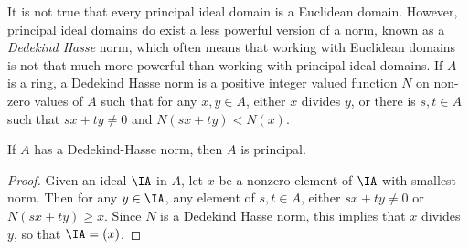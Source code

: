 It is not true that every principal ideal domain is a Euclidean domain. However, principal ideal domains do exist a less powerful version of a norm, known as a \emph{Dedekind Hasse} norm, which often means that working with Euclidean domains is not that much more powerful than working with principal ideal domains. If $A$ is a ring, a Dedekind Hasse norm is a positive integer valued function $N$ on non-zero values of $A$ such that for any $x,y \in A$, either $x$ divides $y$, or there is $s,t \in A$ such that $sx + ty \neq 0$ and $N(sx + ty) < N(x)$.

\begin{theorem}
    If $A$ has a Dedekind-Hasse norm, then $A$ is principal.
\end{theorem}
\begin{proof}
    Given an ideal $\IA$ in $A$, let $x$ be a nonzero element of $\IA$ with smallest norm. Then for any $y \in \IA$, any element of $s,t \in A$, either $sx + ty \neq 0$ or $N(sx + ty) \geq x$. Since $N$ is a Dedekind Hasse norm, this implies that $x$ divides $y$, so that $\IA = (x)$.
\end{proof}

